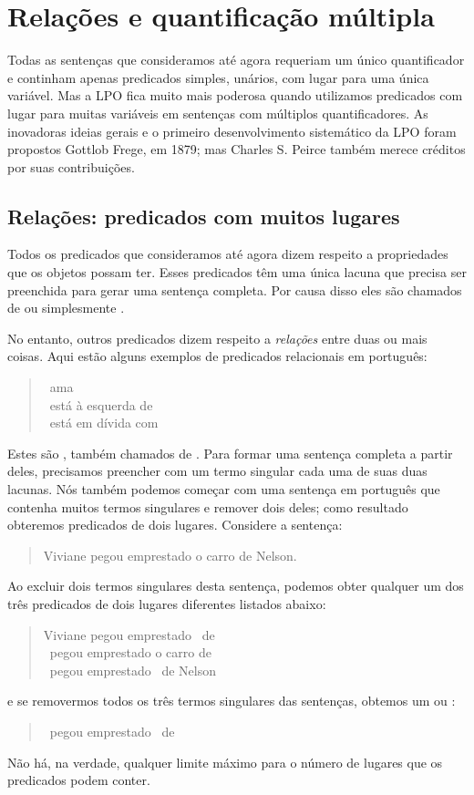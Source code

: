 \chapter{Relações e quantificação múltipla}\label{s:MultipleGenerality}
Todas as sentenças que consideramos até agora requeriam um único quantificador e continham apenas predicados simples, unários, com lugar para uma única variável. 
Mas a LPO fica muito mais poderosa quando utilizamos predicados com lugar para muitas variáveis em sentenças com múltiplos quantificadores.
As inovadoras ideias gerais e o primeiro desenvolvimento sistemático da LPO foram propostos \mbox{Gottlob} Frege, em 1879; mas Charles S. Peirce também merece créditos por suas contribuições.


\section{Relações: predicados com muitos lugares}
Todos os predicados que consideramos até agora dizem respeito a propriedades que os objetos possam ter.
Esses predicados têm uma única lacuna que precisa ser preenchida para gerar uma sentença completa.
Por causa disso eles são chamados de  ou simplesmente .

No entanto, outros predicados dizem respeito a \emph{relações} entre duas ou mais coisas.
Aqui estão alguns exemplos de predicados relacionais em português:
	\begin{quote}
		\blank\ ama \blank\\
		\blank\ está à esquerda de \blank\\
		\blank\ está em dívida com \blank
	\end{quote}
Estes são , também chamados de .
Para formar uma sentença completa a partir deles, precisamos preencher com um termo singular cada uma de suas duas lacunas.
Nós também podemos começar com uma sentença em português que contenha muitos termos singulares e remover dois deles; como resultado obteremos predicados de dois lugares.
Considere a sentença:
\begin{quote}
	Viviane pegou emprestado o carro de Nelson.
\end{quote}
Ao excluir dois termos singulares desta sentença, podemos obter qualquer um dos  três predicados de dois lugares diferentes listados abaixo:
	\begin{quote}
		Viviane pegou emprestado \blank\ de \blank\\
		\blank\ pegou emprestado o carro de \blank\\
		\blank\ pegou emprestado \blank\ de Nelson
	\end{quote}
e se removermos todos os três termos singulares das sentenças, obtemos um  ou :
	\begin{quote}
		\blank\ pegou emprestado \blank\ de \blank
	\end{quote}
Não há, na verdade, qualquer limite máximo para o número de lugares que os predicados podem conter.

